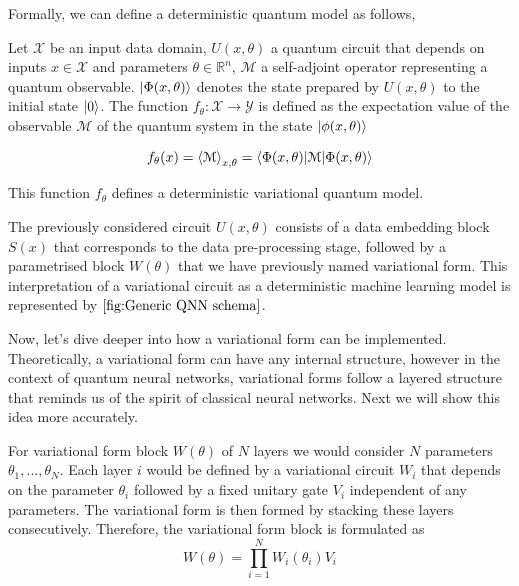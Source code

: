 Formally, we can define a deterministic quantum model as follows,

\begin{definicion} \label{def:deterministic quantum model}
    Let $\mathcal{X}$ be an input data domain, $U(x, \theta)$ a quantum circuit that depends on inputs $x\in \mathcal{X}$ and parameters $\theta \in \mathbb{R}^n$, $\mathcal{M}$ a self-adjoint operator representing a quantum observable. $\ket{\Phi(x, \theta)}$ denotes the state prepared by $U(x, \theta)$ to the initial state $\ket{0}$. The function $f_{\theta}: \mathcal{X} \longrightarrow \mathcal{Y}$ is defined as the expectation value of the observable $\mathcal{M}$ of the quantum system in the state $\ket{\phi(x, \theta)} $

    \begin{equation}
        f_{\theta}(x)= \braket{\mathcal{M}}_{x,\theta} = \braket{\Phi(x,\theta) | \mathcal{M} | \Phi(x, \theta)}
    \end{equation}

    This function $f_{\theta}$ defines a deterministic variational quantum model.
\end{definicion}

The previously considered circuit $U(x,\theta)$ consists of a data embedding block $S(x)$ that corresponds to the data pre-processing stage, followed by a parametrised block $W(\theta)$ that we have previously named variational form. This interpretation of a variational circuit as a deterministic machine learning model is represented by $\autoref{fig:Generic QNN schema}$.

Now, let's dive deeper into how a variational form can be implemented. Theoretically, a variational form can have any internal structure, however in the context of quantum neural networks, variational forms follow a layered structure that reminds us of the spirit of classical neural networks. Next we will show this idea more accurately.

For variational form block $W(\theta)$ of $N$ layers we would consider $N$ parameters $\theta_1, ..., \theta_N$. Each layer $i$ would be defined by a variational circuit $W_i$ that depends on the parameter $\theta_i$ followed by a fixed unitary gate $V_i$ independent of any parameters. The variational form is then formed by stacking these layers consecutively. Therefore, the variational form block is formulated as
\begin{equation}
    W(\theta)=\prod_{i=1}^N W_{i}(\theta_i) V_i
\end{equation}

